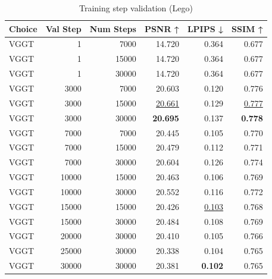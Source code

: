 \begin{table}[H]
\caption{Training step validation (Lego)}
\label{tab:99_training_step_validation_lego}
\begin{tabular}{lrrrrr}
\toprule
Choice & Val Step & Num Steps & PSNR ↑ & LPIPS ↓ & SSIM ↑ \\
\midrule
VGGT & 1 & 7000 & 14.720 & 0.364 & 0.677 \\
VGGT & 1 & 15000 & 14.720 & 0.364 & 0.677 \\
VGGT & 1 & 30000 & 14.720 & 0.364 & 0.677 \\
VGGT & 3000 & 7000 & 20.603 & 0.120 & 0.776 \\
VGGT & 3000 & 15000 & \underline{20.661} & 0.129 & \underline{0.777} \\
VGGT & 3000 & 30000 & \textbf{20.695} & 0.137 & \textbf{0.778} \\
VGGT & 7000 & 7000 & 20.445 & 0.105 & 0.770 \\
VGGT & 7000 & 15000 & 20.479 & 0.112 & 0.771 \\
VGGT & 7000 & 30000 & 20.604 & 0.126 & 0.774 \\
VGGT & 10000 & 15000 & 20.463 & 0.106 & 0.769 \\
VGGT & 10000 & 30000 & 20.552 & 0.116 & 0.772 \\
VGGT & 15000 & 15000 & 20.426 & \underline{0.103} & 0.768 \\
VGGT & 15000 & 30000 & 20.484 & 0.108 & 0.769 \\
VGGT & 20000 & 30000 & 20.410 & 0.105 & 0.766 \\
VGGT & 25000 & 30000 & 20.338 & 0.104 & 0.765 \\
VGGT & 30000 & 30000 & 20.381 & \textbf{0.102} & 0.765 \\
\bottomrule
\end{tabular}
\end{table}
